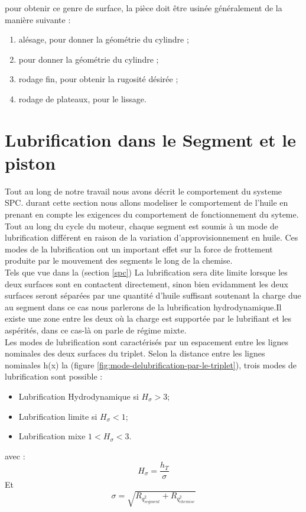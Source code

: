 pour obtenir ce genre de surface, la pièce doit être usinée généralement de la manière suivante :
\begin{enumerate}
	\item alésage, pour donner la géométrie du cylindre ;
	\item pour donner la géométrie du cylindre ;
	\item rodage fin, pour obtenir la rugosité désirée ;
	\item rodage de plateaux, pour le lissage.
\end{enumerate}

\section{Lubrification dans le Segment et le piston }
Tout au long de notre travail nous avons décrit le comportement du systeme SPC. durant cette section nous allons modeliser le comportement de l'huile en prenant en compte les exigences du comportement de fonctionnement du syteme.\\

Tout au long du cycle du moteur, chaque segment est soumis à un mode de lubrification différent en raison de la variation d’approvisionnement en huile. Ces modes de la lubrification ont un important effet sur la force de frottement produite par le mouvement des segments le long de la chemise. \\

Tels que vue dans la (section \ref{spc}) La lubrification sera dite limite lorsque les deux surfaces sont en contactent directement, sinon bien evidamment les deux surfaces seront séparées par une quantité d'huile suffisant soutenant la charge due au segment dans ce cas nous parlerons de la lubrification hydrodynamique.Il existe une zone entre les deux où la charge est supportée par le lubrifiant et les aspérités, dans ce cas-là on parle de régime mixte. \\

Les modes de lubrification sont caractérisés par un espacement entre les lignes nominales des deux surfaces du triplet. Selon la distance entre les lignes nominales h(x) la (figure \ref{fig:mode-delubrification-par-le-triplet}), trois modes de lubrification sont possible :\\
\begin{itemize}
	\item Lubrification Hydrodynamique si $H_{\sigma} > 3 $;
	\item Lubrification limite si $H_{\sigma}<1$;
	\item Lubrification mixe $1<H_{\sigma} < 3$.
\end{itemize}
avec : $$ H_{\sigma} = \frac{h_{T}}{\sigma} $$
Et 
\begin{equation}
	\sigma =\sqrt{{R}_{q}_{segment}^{2}+{R}_{q}_{chemise}^{2}}
\end{equation}

